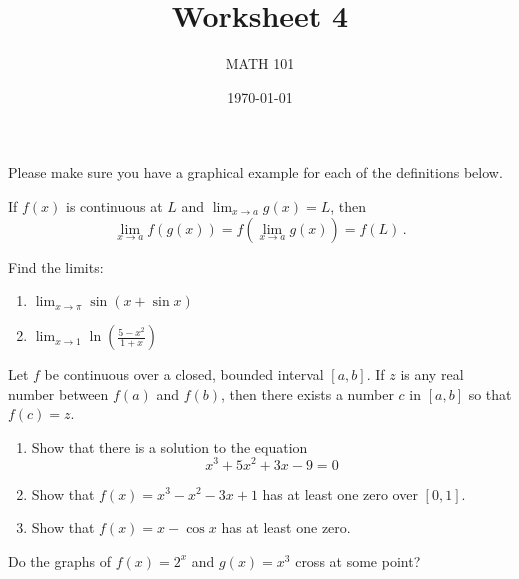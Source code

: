 \documentclass[12pt]{amsart}
\title{ Worksheet 4}
\author{MATH 101}
\date{\today}
\begin{document}
\maketitle

Please make sure you have a graphical example for each of the definitions below.

\begin{theorem}
	If $f(x)$ is continuous at $L$ and $\lim_{x \to a} g(x) = L$, then
	\begin{equation*}
		\lim_{x\to a} f(g(x)) = f(\lim_{x\to a} g(x)) = f(L) \,.
	\end{equation*}
\end{theorem}

\begin{question}
	Find the limits:
	\begin{enumerate}
		\item $\lim_{x \to \pi } \sin(x + \sin x)$
		      \vspace{5cm}
		\item $\displaystyle \lim_{x \to 1} \ln\left( \frac{5 - x^2}{1 + x} \right)$
		      \vspace{5cm}
	\end{enumerate}

\end{question}



\begin{theorem}
	Let $f$ be continuous over a closed, bounded interval $[a,b]$.
	If $z$ is any real number between $f(a)$ and $f(b)$, then there exists
	a number $c$ in $[a,b]$ so that $f(c) = z$.
\end{theorem}


\begin{question}
	\begin{enumerate}
		\item Show that there is a solution to the equation
		      $$x^3 + 5x^2 + 3x - 9 = 0$$
		      \vspace{5cm}
		\item Show that $f(x) = x^3 - x^2 -3x + 1$ has at least one zero over $[0,1]$.
		      \vspace{5cm}
		\item Show that $f(x) = x - \cos x$ has at least one zero.
	\end{enumerate}
\end{question}


\begin{question}
	Do the graphs of $f(x) = 2^x$ and $g(x) = x^3$ cross at some point?
\end{question}
\end{document}

